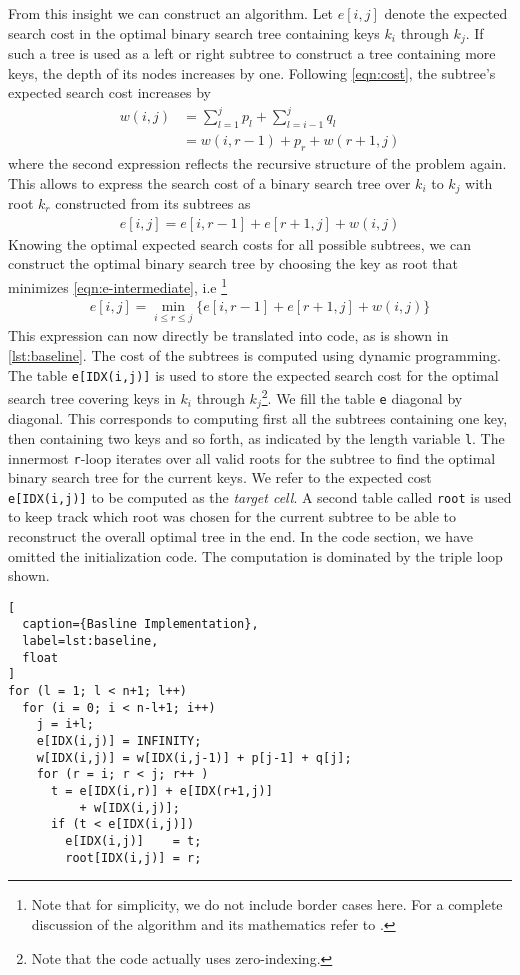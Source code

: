 From this insight we can construct an algorithm. Let $e[i,j]$ denote the
expected search cost in the optimal binary search tree containing keys
$k_i$ through $k_j$. If such a tree is used as a left or right subtree to
construct a tree containing more keys, the depth of its nodes increases by
one. Following \autoref{eqn:cost}, the subtree's expected search cost
increases by
\begin{align}
  w(i,j) &= \sum_{l=1}^j p_l + \sum_{l=i-1}^j q_l \nonumber\\
         &= w(i,r-1) + p_r + w(r+1,j)
  \label{eqn:w}
\end{align}
where the second expression reflects the recursive structure of the problem
again. This allows to express the search cost of a binary search tree over
$k_i$ to $k_j$ with root $k_r$ constructed from its subtrees as
\begin{align}
  e[i,j] = e[i,r-1] + e[r+1,j] + w(i,j)
  \label{eqn:e-intermediate}
\end{align}
Knowing the optimal expected search costs for all possible subtrees, we can
construct the optimal binary search tree by choosing the key as root that
minimizes \autoref{eqn:e-intermediate}, i.e
\footnote{Note that for simplicity, we do not include border cases here.
For a complete discussion of the algorithm and its mathematics refer to
\cite{MITBook}.}
\begin{align}
  e[i,j] = \min_{i\leq r\leq j} \{e[i,r-1] + e[r+1,j] + w(i,j)\}
  \label{eqn:e}
\end{align}
This expression can now directly be translated into code, as is shown in
\autoref{lst:baseline}. The cost of the subtrees is computed using dynamic
programming. The table \texttt{e[IDX(i,j)]} is used to store the
expected search cost for the optimal search tree covering keys in $k_i$
through $k_j$\footnote{Note that the code actually uses zero-indexing.}. We
fill the table \texttt{e} diagonal by diagonal. This corresponds to
computing first all the subtrees containing one key, then containing two
keys and so forth, as indicated by the length variable \texttt{l}. The
innermost \texttt{r}-loop iterates over all valid roots for the subtree to
find the optimal binary search tree for the current keys. We refer to the
expected cost \texttt{e[IDX(i,j)]} to be computed as the \emph{target
cell}. A second table called \texttt{root} is used to keep track which root
was chosen for the current subtree to be able to reconstruct the overall
optimal tree in the end. In the code section, we have omitted the
initialization code. The computation is dominated by the triple loop shown.
\begin{lstlisting}[
  caption={Basline Implementation},
  label=lst:baseline,
  float
]
for (l = 1; l < n+1; l++)
  for (i = 0; i < n-l+1; i++)
    j = i+l;
    e[IDX(i,j)] = INFINITY;
    w[IDX(i,j)] = w[IDX(i,j-1)] + p[j-1] + q[j];
    for (r = i; r < j; r++ )
      t = e[IDX(i,r)] + e[IDX(r+1,j)]
          + w[IDX(i,j)];
      if (t < e[IDX(i,j)])
        e[IDX(i,j)]    = t;
        root[IDX(i,j)] = r;
\end{lstlisting}

